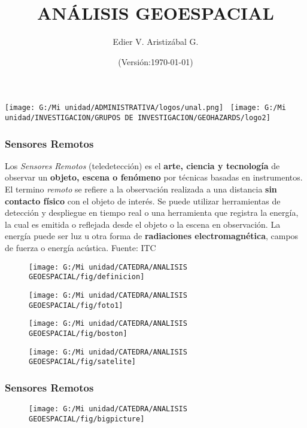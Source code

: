 \documentclass[14pt]{beamer}
\title[Sensores Remotos]{ANÁLISIS GEOESPACIAL}
\author[Edier Aristizábal]{Edier V. Aristizábal G.}
\institute{\emph{evaristizabalg@unal.edu.co}}
\date{(Versión:\today)}
\begin{document}
\begin{frame}
\titlepage
\centering
	\texttt{[image: G:/Mi unidad/ADMINISTRATIVA/logos/unal.png]}\hspace*{4.75cm}~%
   	\texttt{[image: G:/Mi unidad/INVESTIGACION/GRUPOS DE INVESTIGACION/GEOHAZARDS/logo2]} 
\end{frame}
\begin{frame}
\frametitle{Sensores Remotos}
\scriptsize {Los \emph{Sensores Remotos} (teledetección) es el \textbf{arte, ciencia y tecnología} de observar un \textbf{objeto, escena o fenómeno} por técnicas basadas en instrumentos. El termino \emph{remoto} se refiere a la observación realizada a una distancia \textbf{sin contacto físico} con el objeto de interés. Se puede utilizar herramientas de detección y despliegue en tiempo real o una herramienta que registra la energía, la cual es emitida o reflejada desde el objeto o la escena en observación. La energía puede ser luz u otra forma de \textbf{radiaciones electromagnética}, campos de fuerza o energía acústica.}
\tiny{Fuente: ITC} 
  \begin{figure}
    \centering
    \texttt{[image: G:/Mi unidad/CATEDRA/ANALISIS GEOESPACIAL/fig/definicion]}
   \end{figure}
\end{frame}
\begin{frame}
  \begin{figure}
    \centering
    \texttt{[image: G:/Mi unidad/CATEDRA/ANALISIS GEOESPACIAL/fig/foto1]}
\tiny{}
 \end{figure}
\end{frame}
\begin{frame}
  \begin{figure}
    \centering
    \texttt{[image: G:/Mi unidad/CATEDRA/ANALISIS GEOESPACIAL/fig/boston]}
\tiny{}
 \end{figure}
\end{frame}
\begin{frame}
  \begin{figure}
    \centering
    \texttt{[image: G:/Mi unidad/CATEDRA/ANALISIS GEOESPACIAL/fig/satelite]}
\tiny{}
 \end{figure}
\end{frame}
\begin{frame}
\frametitle{Sensores Remotos}
  \begin{figure}
    \centering
    \texttt{[image: G:/Mi unidad/CATEDRA/ANALISIS GEOESPACIAL/fig/bigpicture]}
\tiny{}
 \end{figure}
\end{frame}
\end{document}
